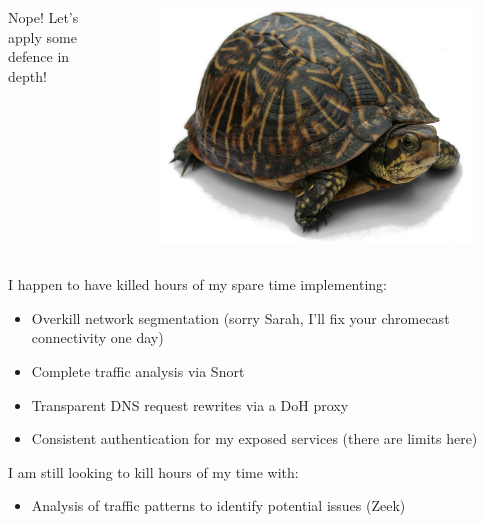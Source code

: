 \documentclass{beamer}
\begin{document}
\begin{frame}
    \begin{columns}
        \begin{column}{0.5\textwidth}
            Nope! Let's apply some defence in depth!
        \end{column}
        \begin{column}{0.5\textwidth}
            \begin{figure}
                \centering
                \includegraphics[width=\textwidth,keepaspectratio]{../resources/turtle.jpg}
            \end{figure}
        \end{column}
    \end{columns}
\end{frame}

\begin{frame}
    I happen to have killed hours of my spare time implementing:
    \begin{itemize}
        \item Overkill network segmentation (sorry Sarah, I'll fix your chromecast connectivity one day)
        \item Complete traffic analysis via Snort
        \item Transparent DNS request rewrites via a DoH proxy
        \item Consistent authentication for my exposed services (there are limits here)
    \end{itemize}
    I am still looking to kill hours of my time with:
    \begin{itemize}
        \item Analysis of traffic patterns to identify potential issues (Zeek)
    \end{itemize}
\end{frame}
\end{document}
